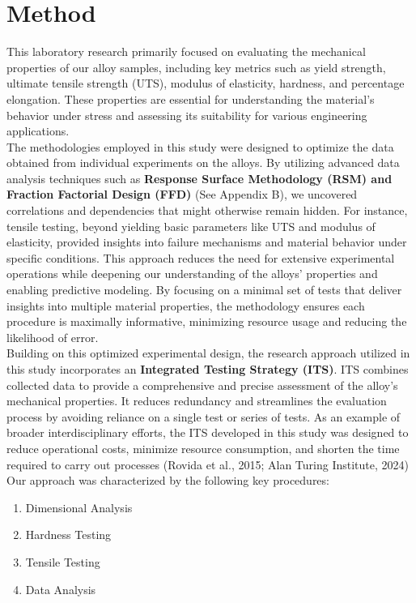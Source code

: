 \documentclass{article}
\begin{document}
\section{Method}
This laboratory research primarily focused on evaluating the mechanical properties of our alloy samples, including key metrics such as yield strength, ultimate tensile strength (UTS), modulus of elasticity, hardness, and percentage elongation. These properties are essential for understanding the material's behavior under stress and assessing its suitability for various engineering applications.\\[8pt]
The methodologies employed in this study were designed to optimize the data obtained from individual experiments on the alloys. By utilizing advanced data analysis techniques such as \textbf{Response Surface Methodology (RSM) and Fraction Factorial Design (FFD)} (See Appendix B), we uncovered correlations and dependencies that might otherwise remain hidden. For instance, tensile testing, beyond yielding basic parameters like UTS and modulus of elasticity, provided insights into failure mechanisms and material behavior under specific conditions. This approach reduces the need for extensive experimental operations while deepening our understanding of the alloys' properties and enabling predictive modeling. By focusing on a minimal set of tests that deliver insights into multiple material properties, the methodology ensures each procedure is maximally informative, minimizing resource usage and reducing the likelihood of error.\\[8pt]
Building on this optimized experimental design, the research approach utilized in this study incorporates an \textbf{Integrated Testing Strategy (ITS)}. ITS combines collected data to provide a comprehensive and precise assessment of the alloy's mechanical properties. It reduces redundancy and streamlines the evaluation process by avoiding reliance on a single test or series of tests. As an example of broader interdisciplinary efforts, the ITS developed in this study was designed to reduce operational costs, minimize resource consumption, and shorten the time required to carry out processes (Rovida et al., 2015; Alan Turing Institute, 2024)\\[8pt]
Our approach was characterized by the following key procedures:
\begin{enumerate}[itemsep=-0.5mm]
    \item Dimensional Analysis
    \item Hardness Testing
    \item Tensile Testing 
    \item Data Analysis
\end{enumerate}
\end{document}
